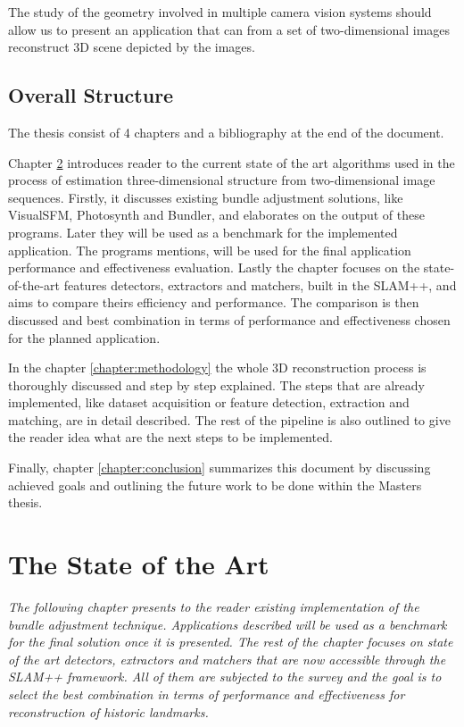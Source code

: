The study of the geometry involved in multiple camera vision systems should allow us to present an application that can from a set of two-dimensional images reconstruct 3D scene depicted by the images.

\section{Overall Structure}
The thesis consist of 4 chapters and a bibliography at the end of the document.

Chapter \ref{chapter:the-state-of-the-art} introduces reader to the current state of the art algorithms used in the process of estimation three-dimensional structure from two-dimensional image sequences. Firstly, it discusses existing bundle adjustment solutions, like VisualSFM, Photosynth and Bundler, and elaborates on the output of these programs. Later they will be used as a benchmark for the implemented application. The programs mentions, will be used for the final application performance and effectiveness evaluation. Lastly the chapter focuses on the state-of-the-art features detectors, extractors and matchers, built in the SLAM++, and aims to compare theirs efficiency and performance. The comparison is then discussed and best combination in terms of performance and effectiveness chosen for the planned application.

In the chapter \ref{chapter:methodology} the whole 3D reconstruction process is thoroughly discussed and step by step explained. The steps that are already implemented, like dataset acquisition or feature detection, extraction and matching, are in detail described. The rest of the pipeline is also outlined to give the reader idea what are the next steps to be implemented. 

Finally, chapter \ref{chapter:conclusion} summarizes this document by discussing achieved goals and outlining the future work to be done within the Masters thesis.

\chapter{The State of the Art}
\label{chapter:the-state-of-the-art}
\textit{The following chapter presents to the reader existing implementation of the bundle adjustment technique. Applications described  will be used as a benchmark for the final solution once it is presented. The rest of the chapter focuses on state of the art detectors, extractors and matchers that are now accessible through the SLAM++ framework. All of them are subjected to the survey and the goal is to select the best combination in terms of performance and effectiveness for reconstruction of historic landmarks.}

